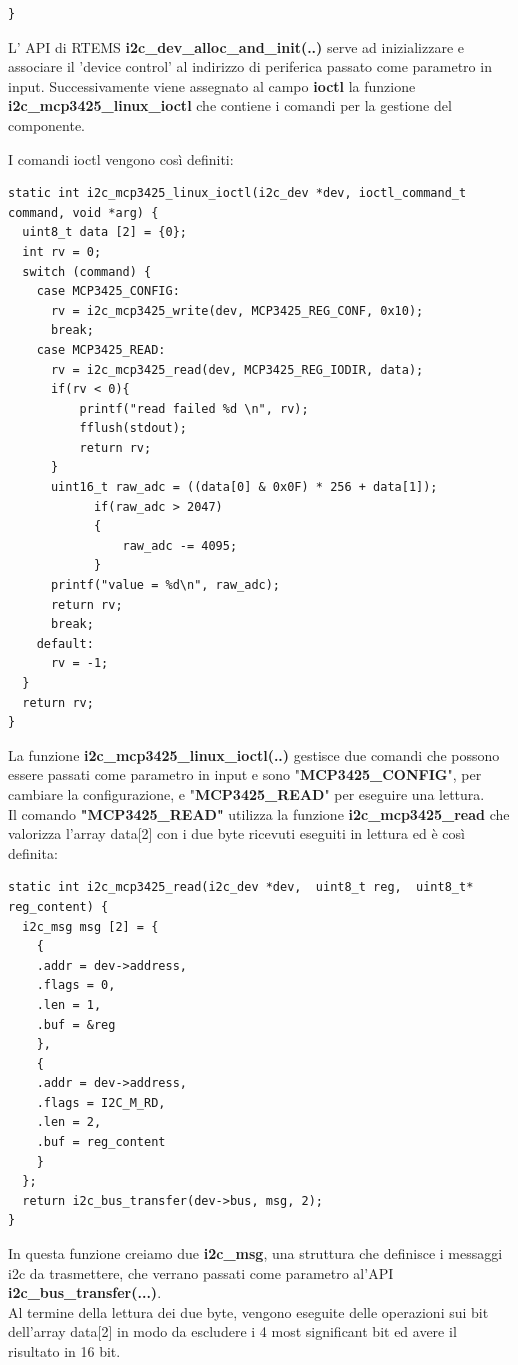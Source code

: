 \documentclass[12pt, a4paper, titlepage, oneside]{book}
\begin{document}
\begin{flushleft}
\begin{lstlisting}[style = CStyle]
}
\end{lstlisting}
L' API di RTEMS \textbf{i2c\_dev\_alloc\_and\_init(..)} serve ad inizializzare e associare il 'device control' al indirizzo di periferica passato come parametro in input. Successivamente viene assegnato al campo \textbf{ioctl} la funzione \textbf{i2c\_mcp3425\_linux\_ioctl} che contiene i comandi per la gestione del componente.

\newpage
I comandi ioctl vengono così definiti: 
\begin{lstlisting}[style = CStyle]
static int i2c_mcp3425_linux_ioctl(i2c_dev *dev, ioctl_command_t command, void *arg) {
  uint8_t data [2] = {0};
  int rv = 0;
  switch (command) {
    case MCP3425_CONFIG:
      rv = i2c_mcp3425_write(dev, MCP3425_REG_CONF, 0x10);
      break;
    case MCP3425_READ:
      rv = i2c_mcp3425_read(dev, MCP3425_REG_IODIR, data);
      if(rv < 0){
    	  printf("read failed %d \n", rv);
    	  fflush(stdout);
    	  return rv;
      }
      uint16_t raw_adc = ((data[0] & 0x0F) * 256 + data[1]);
      		if(raw_adc > 2047)
      		{
      			raw_adc -= 4095;
      		}
      printf("value = %d\n", raw_adc);
      return rv;
      break;
    default:
      rv = -1;
  }
  return rv;
}
\end{lstlisting}
La funzione \textbf{i2c\_mcp3425\_linux\_ioctl(..) }gestisce due comandi che possono essere passati come parametro in input e sono "\textbf{MCP3425\_CONFIG}", per cambiare la configurazione, e "\textbf{MCP3425\_READ}" per eseguire una lettura.\\
\newpage
Il comando \textbf{"MCP3425\_READ"} utilizza la funzione \textbf{i2c\_mcp3425\_read} che valorizza l'array data[2] con i due byte ricevuti eseguiti in lettura ed è così definita: 
\begin{lstlisting}[style = CStyle]
static int i2c_mcp3425_read(i2c_dev *dev,  uint8_t reg,  uint8_t* reg_content) {
  i2c_msg msg [2] = {
    {
    .addr = dev->address,
    .flags = 0,
    .len = 1,
    .buf = &reg
    },
    {
    .addr = dev->address,
    .flags = I2C_M_RD,
    .len = 2,
    .buf = reg_content
    }
  };
  return i2c_bus_transfer(dev->bus, msg, 2);
}
\end{lstlisting}
In questa funzione creiamo due \textbf{i2c\_msg}, una struttura che definisce i messaggi i2c da trasmettere, che verrano passati come parametro al'API \textbf{i2c\_bus\_transfer(...)}.\\
Al termine della lettura dei due byte, vengono eseguite delle operazioni sui bit dell'array data[2] in modo da escludere i 4 most significant bit ed avere il risultato in 16 bit.\\

\end{flushleft}
\end{document}

